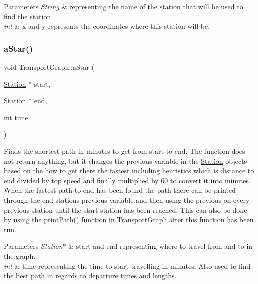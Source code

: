 \begin{DoxyParams}{Parameters}
{\em String} & representing the name of the station that will be used to find the station. \\
\hline
{\em int} & x and y represents the coordinates where this station will be. \\
\hline
\end{DoxyParams}
\mbox{\label{class_transport_graph_a2272ac3ddfd7efee405d36d44108037d}} 
\subsubsection{\texorpdfstring{aStar()}{aStar()}}
{\footnotesize\ttfamily void Transport\+Graph\+::a\+Star (\begin{DoxyParamCaption}\item[{\mbox{\hyperlink{class_station}{Station}} $\ast$}]{start,  }\item[{\mbox{\hyperlink{class_station}{Station}} $\ast$}]{end,  }\item[{int}]{time }\end{DoxyParamCaption})}

Finds the shortest path in minutes to get from start to end. The function does not return anything, but it changes the previous variable in the \mbox{\hyperlink{class_station}{Station}} objects based on the how to get there the fastest including heuristics which is distance to end divided by top speed and finally multiplied by 60 to convert it into minutes. When the fastest path to end has been found the path there can be printed through the end stations previous variable and then using the previous on every previous station until the start station has been reached. This can also be done by using the \mbox{\hyperlink{class_transport_graph_adcd1d4c8068b5b524cbd323061caf068}{print\+Path()}} function in \mbox{\hyperlink{class_transport_graph}{Transport\+Graph}} after this function has been run.


\begin{DoxyParams}{Parameters}
{\em Station$\ast$} & start and end representing where to travel from and to in the graph. \\
\hline
{\em int} & time representing the time to start travelling in minutes. Also used to find the best path in regards to departure times and lengths. \\
\hline
\end{DoxyParams}
\mbox{\label{class_transport_graph_a2ed30af16042cda3aa65b5b6b57deb62}} 
